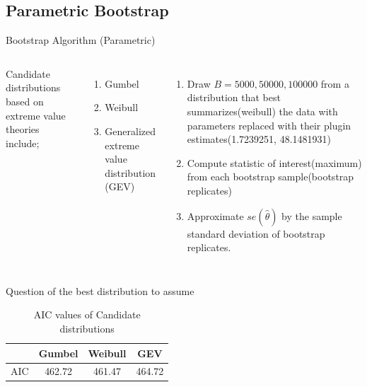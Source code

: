 \documentclass[a4paper,9pt]{beamer}\usepackage[]{graphicx}\usepackage[]{color}
\begin{document}
\subsection{Parametric Bootstrap}
\begin{frame}{Bootstrap Algorithm (Parametric)}
\begin{columns}
Candidate distributions based on extreme value theories include;
\begin{enumerate}[i]
\item Gumbel
\item Weibull
\item Generalized extreme value distribution (GEV)
\end{enumerate}

\begin{enumerate}[i]
\item Draw $B=5000, 50000, 100000$ from a \alert{distribution that best summarizes(weibull)} the data with parameters replaced with their plugin estimates(1.7239251, 48.1481931)
\item Compute statistic of interest(maximum) from each bootstrap sample(bootstrap replicates)
\item Approximate $se(\hat{\theta})$ by the sample standard deviation of bootstrap replicates.
\end{enumerate}
\end{columns}

\alert{Question of the best distribution to assume}
\begin{table}[h]
\begin{tabular}{cccc}
\hline
& Gumbel & \alert{Weibull} & GEV\\
\hline
AIC & 462.72 & \alert{461.47} & 464.72\\
\hline
\end{tabular}
\caption{AIC values of Candidate distributions}
\end{table}

\end{frame}
\end{document}
